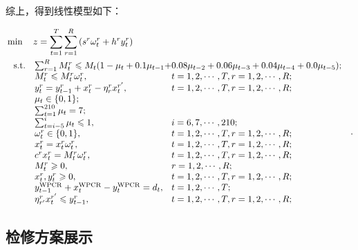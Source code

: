 综上，得到线性模型如下：

\begin{equation}\label{三模型}
	\begin{aligned}
&\min \quad z  = \sum_{t  = 1}^{T} \sum_{r = 1}^{R}\left(s^{r} \omega_{t}^{r}+h^{r} y_{t}^{r}\right)\\
& \ \begin{array}{r@{\quad}l@{}l@{\quad}l}
\mathrm{s.t. }
&	\sum_{r=1}^{R} M_{t}^{r} \leqslant M_{t}(1-\mu_{t}+0.1 \mu_{t-1}+&0.08 \mu_{t-2}+0.06 \mu_{t-3}+0.04 \mu_{t-4}+0.0 \mu_{t-5});\\
&M_{t}^{r} \leqslant M_{t}^{r} \omega_{t}^{r}, &t=1,2, \cdots, T, r=1,2, \cdots, R;\\
& y_{t}^{r}=y_{t-1}^{r}+x_{t}^{r}-\eta_{r}^{r} x_{t}^{r^{\prime}}, &t=1,2, \cdots, T,  r=1,2, \cdots, R; \\
&\mu_{t} \in\{0,1\};&\\
&\sum_{t=1}^{210}\mu_t=7;&\\
&\sum_{t=i-5}^{i} \mu_{t} \leqslant 1,& i=6,7, \cdots, 210;\\

&\omega_{t}^{r} \in\{0,1\}, &t=1,2, \cdots, T, r=1,2, \cdots, R; \\
&x_{t}^{r}=x_{t}^{r} \omega_{t}^{r},&t=1,2, \cdots, T, r=1,2, \cdots, R;\\
&c^{r} x_{t}^{r}=M_{t}^{r} \omega_{t}^{r}, &t=1,2, \cdots, T, r=1,2, \cdots, R; \\
&M_{t}^{r} \geqslant 0,& r=1,2, \cdots, R ;\\
&x_{t}^{r}, y_{t}^{r} \geqslant 0, &t=1,2, \cdots, T, r=1,2, \cdots, R;\\
&y_{t-1}^{\mathrm{WPCR}}+x_{t}^{\mathrm{WPCR}}-y_{t}^{\mathrm{WPCR}}=d_{t}, & t=1,2, \cdots, T; \\
&\eta_{r^{\prime}}^{r} x_{t}^{r^{\prime}} \leqslant y_{t-1}^{r}, &t=1,2, \cdots, T, r=1,2, \cdots, R;
\end{array}.
\end{aligned}
\end{equation}

\subsection{检修方案展示} %
\label{sub:检修方案展示}


